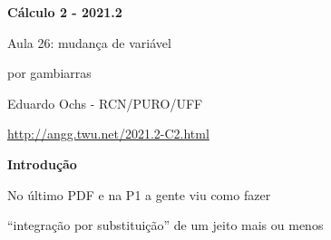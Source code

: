 \documentclass[oneside,12pt]{article}
\begin{document}
%



\def\u#1{\par{\footnotesize \url{#1}}}

\def\drafturl{http://angg.twu.net/LATEX/2021-2-C2.pdf}
\def\drafturl{http://angg.twu.net/2021.2-C2.html}
\def\draftfooter{\tiny \href{\drafturl}{\jobname{}} \ColorBrown{\shorttoday{} \hours}}



%

\thispagestyle{empty}

\begin{center}

\vspace*{1.2cm}

{\bf \Large Cálculo 2 - 2021.2}

\bsk

Aula 26: mudança de variável

por gambiarras

\bsk

Eduardo Ochs - RCN/PURO/UFF

\url{http://angg.twu.net/2021.2-C2.html}

\end{center}

\newpage


{\bf Introdução}

No último PDF e na P1 a gente viu como fazer

``integração por substituição'' de um jeito mais ou menos
\end{document}
